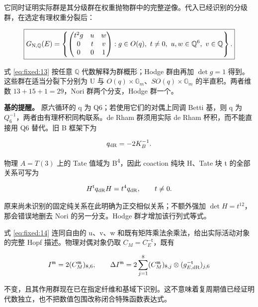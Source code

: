 \documentclass[11pt,a4paper,oneside]{ctexrep}
\theoremstyle{cnplain}
\theoremstyle{definition}
\theoremstyle{remark}
\begin{document}
它同时证明实际群是其分级群在权重抛物群中的完整逆像。代入已经识别的分级群，在选定有理权重分裂后：

\begin{equation}
\boxed{
 G_{\rm N,\mathbb Q}(E)=
 \left\{\begin{pmatrix}t^2g&u&w\\0&t&v\\0&0&1\end{pmatrix}:
     g\in O(q),\ t\ne0,\ u,w\in\mathbb Q^6,\ v\in\mathbb Q\right\}.
 }                                                               \label{eq:fixed:13}
\end{equation}

式 \eqref{eq:fixed:13} 按任意 \(\mathbb Q\) 代数解释为群概形；Hodge 群由再加 \(\det g=1\) 得到。这些群在适当分裂下分别为 U 与 \(O(q)\times\mathbb G_m\)、\(SO(q)\times\mathbb G_m\) 的半直积。两者维数 \(13+15+1=29\)，Nori 群两个分支，Hodge 群一个。

\textbf{基的提醒。} 原六循环的 q 为 Q6；若使用它们的对偶上同调 Betti 基，则 q 为 \(Q_6^{-1}\)，两者由有理杯积同构联系。de Rham 群须用实际 de Rham 杯积，而不能直接用 Q6 替代。旧 B 框架下为

\begin{equation}
q_{\rm dR}=-2K_B^{-1}.
\end{equation}

物理 \(A=T(3)\) 上的 Tate 值域为 B\textsuperscript{4}，因此 coaction 纯块 H、Tate 块 t 的全部关系可写为

\begin{equation}
H^{\mathsf t}q_{\rm dR}H=t^4q_{\rm dR},
                  \qquad t\ne0.                                \label{eq:fixed:14}
\end{equation}

原来尚未识别的固定纯关系在此明确为正交相似关系；不额外强加 \(\det H=t^{12}\)，那会错误地删去 Nori 的另一分支。Hodge 群才增加该行列式等式。

式 \eqref{eq:fixed:14} 连同自由的 u、v、w 和既有矩阵乘法余乘法，给出实际活动对象的完整 Hopf 描述。物理对偶对象仍取 \(C_M=C_E^{-\mathsf t}\)，既有

\begin{equation}
I^{\mathfrak m}=2(C_M^{\mathfrak m})_{8,6},\qquad
 \Delta I^{\mathfrak m}
 =2\sum_{j=1}^8(C_M^{\mathfrak m})_{8,j}
       \otimes(g_{E,\rm dR}^{-\mathsf t})_{j,6}
\end{equation}

不变，且其作用群现在已在指定纤维和基域下识别。这不意味着复周期值已经证明代数独立，也不把数值包围改称闭合特殊函数表达式。
\end{document}
